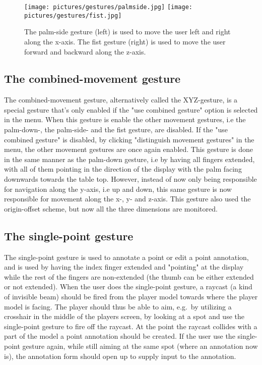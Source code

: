 \begin{figure}%
	\texttt{[image: pictures/gestures/palmside.jpg]}
    \texttt{[image: pictures/gestures/fist.jpg]}
	\caption[The palm-side and fist gestures]{The palm-side gesture (left) is used to move the user left and right along the x-axis. 
             The fist gesture (right) is used to move the user forward and backward along the z-axis.}
	\label{fig:gestures2}
\end{figure} 

\subsection{The combined-movement gesture}
The combined-movement gesture, alternatively called the XYZ-gesture, is a special gesture that's only enabled if the "use combined gesture" option is selected in the menu.
When this gesture is enable the other movement gestures, i.e the palm-down-, the palm-side- and the fist gesture, are disabled. If the "use combined gesture" is disabled, 
by clicking "distinguish movement gestures" in the menu, the other movement gestures are once again enabled. This gesture is done in the same manner as the palm-down gesture, 
i.e by having all fingers extended, with all of them pointing in the direction of the display with the palm facing downwards towards the table top.
However, instead of now only being responsible for navigation along the y-axis, i.e up and down, this same gesture is now responsible for movement along the x-, y- and z-axis.
This gesture also used the origin-offset scheme, but now all the three dimensions are monitored. 

\subsection{The single-point gesture}
The single-point gesture is used to annotate a point or edit a point annotation, and is used by having the index finger extended and "pointing" at the display while the 
rest of the fingers are non-extended (the thumb can be either extended or not extended). 
When the user does the single-point gesture, a raycast (a kind of invisible beam) should be fired from the player model towards where the player model is facing.
The player should thus be able to aim, e.g.~by utilizing a crosshair in the middle of the players screen, by looking at a spot and use the single-point gesture to fire off 
the raycast. At the point the raycast collides with a part of the model a point annotation should be created. If the user use the single-point gesture again, while
still aiming at the same spot (where an annotation now is), the annotation form should open up to supply input to the annotation. 

